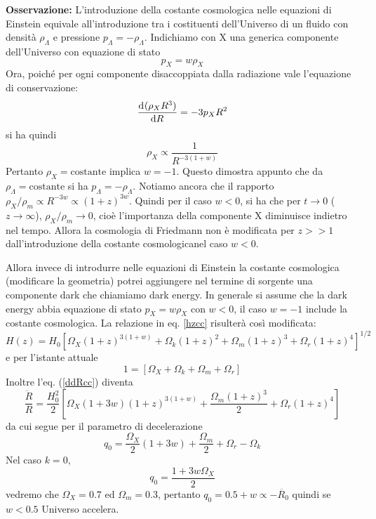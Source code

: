{\bf Osservazione:} L'introduzione della costante cosmologica nelle equazioni di
Einstein equivale all'introduzione tra i costituenti dell'Universo di un fluido
con densità $\rho_{\Lambda}$ e pressione $p_{\Lambda}=-\rho_{\Lambda}$.
Indichiamo con X una generica componente dell'Universo con equazione di stato
\begin{equation}
  p_X = w \rho_X
\end{equation}
Ora, poiché per ogni componente disaccoppiata dalla radiazione vale l'equazione
di conservazione:
\begin{equation}
  \frac{{\mathop{}\!\mathrm{d}^{}}(\rho_X R^3)}{\mathop{}\!\mathrm{d} {R}^{}} = -3 p_X R^2
\end{equation}
si ha quindi
\begin{equation}
  \rho_X \propto \frac {1}{R^{-3(1+w)}}
\end{equation}
Pertanto $\rho_{X}=\text{costante}$ implica $w=-1$.  Questo dimostra appunto che
da $\rho_{\Lambda}=\text{costante}$ si ha $p_{\Lambda}=-\rho_{\Lambda}$.
Notiamo ancora che il rapporto
$\rho_{X}/\rho_m \propto R^{-3w} \propto (1+z)^{3w}$. Quindi per il caso $w<0$,
si ha che per $t \to 0$ ($z \to \infty$), $\rho_{X}/\rho_m \to 0$, cioè
l'importanza della componente X diminuisce indietro nel tempo.  Allora la
cosmologia di Friedmann non è modificata per $z>>1$ dall'introduzione della
costante cosmologicanel caso $w<0$.

Allora invece di introdurre nelle equazioni di Einstein la costante cosmologica
(modificare la geometria) potrei aggiungere nel termine di sorgente una
componente dark che chiamiamo dark energy.  In generale si assume che la dark
energy abbia equazione di stato $p_X=w\rho_X$ con $w<0$, il caso $w=-1$ include
la costante cosmologica. La relazione in eq. \eqref{hzcc} risulterà così
modificata:
\begin{equation}
  H(z)=H_0 \left[ \Omega_{X} (1+z)^{3(1+w)} + \Omega_{k} (1+z)^2+ \Omega_m (1+z)^3 + \Omega_r (1+z)^4 \right]^{1/2}
  \label{hzccX}
\end{equation}
e per l'istante attuale
\begin{equation}
  1= \left[ \Omega_{X} + \Omega_{k} + \Omega_m  + \Omega_r \right]
 \end{equation}
Inoltre l'eq. (\ref{ddRcc}) diventa
\begin{equation}
  \frac {\ddot{R}} {R} = \frac{H_0^2}{2}
  \left[ \Omega_{X} (1+3w) (1+z)^{3(1+w)}
    +\frac {\Omega_m (1+z)^3} {2 }  +
    \Omega_r (1+z)^4 \right]
  \label {ddRw}
\end{equation}
da cui segue per il parametro di decelerazione
\begin{equation}
  q_0= \frac{\Omega_X}{2} (1+3w) +  \frac{\Omega_m}{2} + \Omega_r - \Omega_{k}
\end{equation}
Nel caso $k=0$,
\begin{equation}
  q_0= \frac {1+3w \Omega_{X}}{2}
\end{equation}
vedremo che $\Omega_{X}=0.7$ ed $\Omega_{m}=0.3$, pertanto
$q_0=0.5+w \propto - \ddot{R_0}$ quindi se $w<0.5$ Universo accelera.

